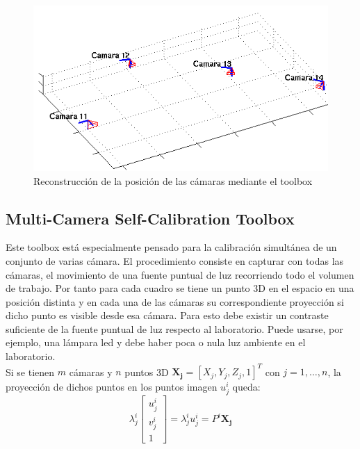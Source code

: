 \begin{figure}[ht!]
\begin{center}
\includegraphics[scale=0.7]{img/calibracion/tablero_cam_relevadas_4c.png}
\end{center}
\caption{Reconstrucción de la posición de las cámaras mediante el toolbox}
\label{fig: tablero_posicion_camaras}
\end{figure}


 \subsection{ Multi-Camera Self-Calibration Toolbox } 
 
 Este toolbox está especialmente pensado para la calibración simultánea de un conjunto de varias cámara. El procedimiento consiste en capturar con todas las cámaras, el movimiento de una fuente puntual de luz recorriendo todo el volumen de trabajo. Por tanto para cada cuadro se tiene un punto 3D en el espacio en una posición distinta y en cada una de las cámaras su correspondiente proyección si dicho punto es visible desde esa cámara. Para esto debe existir un contraste suficiente de la fuente puntual de luz respecto al laboratorio. Puede usarse, por ejemplo, una lámpara led y debe haber poca o nula luz ambiente en el laboratorio.\\
 
 
 Si se tienen $m$ cámaras y $n$ puntos 3D  
$\mathbf{X_j} = [X_j, Y_j, Z_j,1]^T$ con $j=1,\ldots,n$, la proyección de dichos puntos en los puntos imagen $u_j^i$ queda:
\[ \lambda_j^i
\begin{bmatrix}
u_j^i \\
v_j^i \\
1
\end{bmatrix} 
 = \lambda_j^i u_j^i = P^i \mathbf{X_j}
\]

